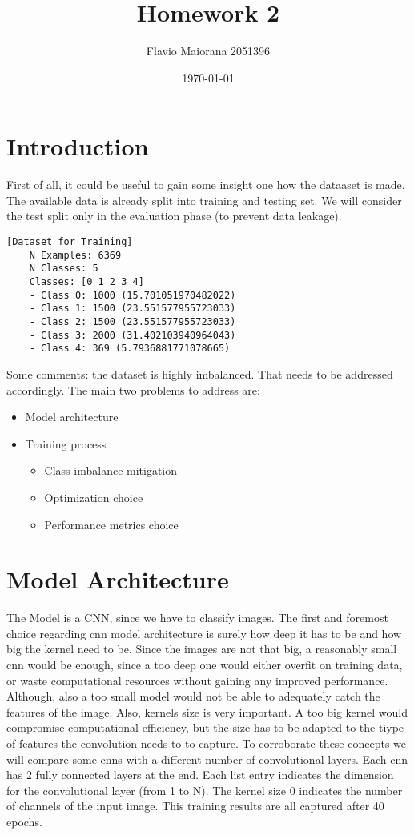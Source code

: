 \documentclass[12pt,a4paper,oneside]{article}
\title{Homework 2}	                                    %
\author{Flavio Maiorana 2051396}				        %
\date{\today}								            %
\begin{document}

\newpage


\section{Introduction}

First of all, it could be useful to gain some insight one how the dataaset is
made. The available data is already split into training and testing set. We
will consider the test split only in the evaluation phase (to prevent
data leakage).

\begin{verbatim}[Dataset for Training]
    N Examples: 6369
    N Classes: 5
    Classes: [0 1 2 3 4]
    - Class 0: 1000 (15.701051970482022)
    - Class 1: 1500 (23.551577955723033)
    - Class 2: 1500 (23.551577955723033)
    - Class 3: 2000 (31.402103940964043)
    - Class 4: 369 (5.7936881771078665)
\end{verbatim}

Some comments: the dataset is highly imbalanced. That needs to be addressed
accordingly. The main two problems to address are:

\begin{itemize}
    \item Model architecture
    \item Training process
    \begin{itemize}
        \item Class imbalance mitigation
        \item Optimization choice
        \item Performance metrics choice
    \end{itemize}
\end{itemize}

\section{Model Architecture}

The Model is a CNN, since we have to classify images. The first and foremost
choice regarding cnn model architecture is surely how deep it has to be and how
big the kernel need to be. Since the images are not that big, a reasonably small
cnn would be enough, since a too deep one would either overfit on training data,
or waste computational resources without gaining any improved performance.
Although, also a too small model would not be able to adequately catch the
features of the image. Also, kernels size is very important. A too big kernel
would compromise computational efficiency, but the size has to be adapted to the
tiype of features the convolution needs to to capture. To corroborate these
concepts we will compare some cnns with a different number of convolutional
layers. Each cnn has 2 fully connected layers at the end. Each list entry
indicates the dimension for the convolutional layer (from 1 to N). The kernel
size 0 indicates the number of channels of the input image. This training
results are all captured after 40 epochs.
\end{document}
